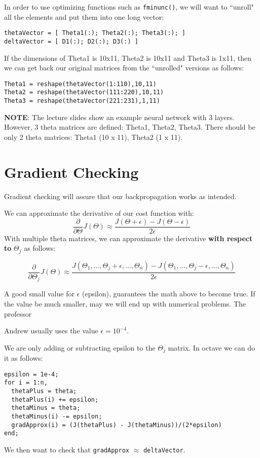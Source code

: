 In order to use optimizing functions such as \verb|fminunc()|, we will want to ``unroll" all the elements and put them into one long vector:
\begin{verbatim}
thetaVector = [ Theta1(:); Theta2(:); Theta3(:); ]
deltaVector = [ D1(:); D2(:); D3(:) ]
\end{verbatim}
If the dimensions of Theta1 is 10x11, Theta2 is 10x11 and Theta3 is 1x11, then we can get back our original matrices from the ``unrolled" versions as follows:

\begin{verbatim}
Theta1 = reshape(thetaVector(1:110),10,11)
Theta2 = reshape(thetaVector(111:220),10,11)
Theta3 = reshape(thetaVector(221:231),1,11)
\end{verbatim}
\textbf{NOTE}: The lecture slides show an example neural network with 3 layers. However, 3 theta matrices are defined: Theta1, Theta2, Theta3. There should be only 2 theta matrices: Theta1 (10 x 11), Theta2 (1 x 11).

\section{Gradient Checking}
Gradient checking will assure that our backpropagation works as intended.

We can approximate the derivative of our cost function with:
\[\dfrac{\partial}{\partial\Theta}J(\Theta) \approx \dfrac{J(\Theta + \epsilon) - J(\Theta - \epsilon)}{2\epsilon}\]
With multiple theta matrices, we can approximate the derivative \textbf{with respect to} $\Theta_j$ as follows:

\[\dfrac{\partial}{\partial\Theta_j}J(\Theta) \approx \dfrac{J(\Theta_1, \dots, \Theta_j + \epsilon, \dots, \Theta_n) - J(\Theta_1, \dots, \Theta_j - \epsilon, \dots, \Theta_n)}{2\epsilon} \]

A good small value for $\epsilon$ (epsilon), guarantees the math above to become true. If the value be much smaller, may we will end up with numerical problems. The professor 

Andrew usually uses the value $\epsilon = 10^{-4}$.

We are only adding or subtracting epsilon to the $\Theta_j$ matrix. In octave we can do it as follows:
\begin{verbatim}
epsilon = 1e-4;
for i = 1:n,
  thetaPlus = theta;
  thetaPlus(i) += epsilon;
  thetaMinus = theta;
  thetaMinus(i) -= epsilon;
  gradApprox(i) = (J(thetaPlus) - J(thetaMinus))/(2*epsilon)
end;
\end{verbatim}
We then want to check that \verb|gradApprox| $\approx$ \verb|deltaVector|.


